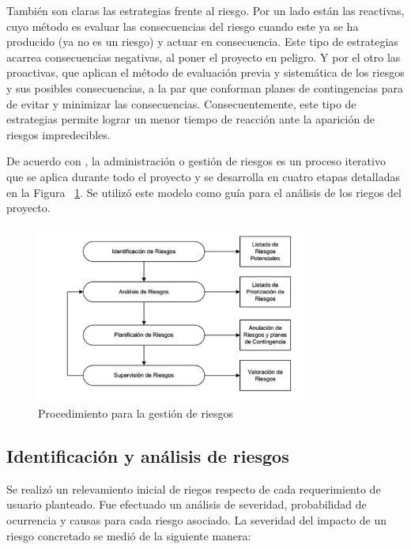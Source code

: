 		\par
     	También son claras las estrategias frente al riesgo. Por un lado están las reactivas, cuyo método es evaluar las consecuencias del riesgo cuando
 		este ya se ha producido (ya no es un riesgo) y actuar en consecuencia. Este tipo de estrategias acarrea consecuencias negativas, al poner el
 		proyecto en peligro. Y por el otro las proactivas, que aplican el método de evaluación previa y sistemática de los riesgos y sus posibles
 		consecuencias, a la par que conforman planes de contingencias para de evitar y minimizar las consecuencias. Consecuentemente, este tipo de
 		estrategias permite lograr un menor tiempo de reacción ante la aparición de riesgos impredecibles.
		\vspace{0.5cm}
		\par
		De acuerdo con \cite{etiqueta_riegos3}, la administración o gestión de riesgos es un proceso iterativo que se aplica durante todo el proyecto y se
		desarrolla en cuatro etapas detalladas en la Figura ~\ref{fig:riesgos}. Se utilizó este modelo como guía para el análisis de los riegos del
		proyecto.
		
		\begin{figure}[!h]
 		\begin{center}
  		\includegraphics[width=0.8\textwidth,keepaspectratio=true]{./images/riesgos}
  		\caption{Procedimiento para la gestión de riesgos}
  		\label{fig:riesgos}
 		\end{center}
		\end{figure}
		
		\subsection{Identificación y análisis de riesgos}
		\par
		Se realizó un relevamiento inicial de riegos respecto de cada requerimiento de usuario planteado. Fue efectuado un análisis de severidad,
		probabilidad de ocurrencia y causas para cada riesgo asociado. La severidad	del	impacto	de un riesgo concretado	se medió de la siguiente
		manera:
		
